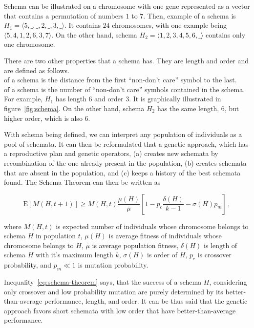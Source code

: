 Schema can be illustrated on a chromosome with one gene represented as a vector that contains a permutation of numbers $1$ to $7$.
Then, example of a schema is $H_1 = \langle 5, \_, \_, 2, \_, 3, \_ \rangle$.
It contains $24$ chromosomes, with one example being $\langle 5, 4, 1, 2, 6, 3, 7 \rangle$.
On the other hand, schema $H_2 = \langle 1, 2, 3, 4, 5, 6, \_ \rangle$ contains only one chromosome.

There are two other properties that a schema has.
They are length and order and are defined as follows.\\

 of a schema is the distance from the first “non-don’t care” symbol to the last.\\

 of a schema is the number of “non-don’t care” symbols contained in the schema.\\

For example, $H_1$ has length $6$ and order $3$.
It is graphically illustrated in figure~\ref{fig:schema}.
On the other hand, schema $H_2$ has the same length, $6$, but higher order, which is also $6$.

With schema being defined, we can interpret any population of individuals as a pool of schemata.
It can then be reformulated that a genetic approach, which has a reproductive plan and
genetic operators, (a) creates new schemata by recombination of the one already present in the population,
(b) creates schemata that are absent in the population, and (c) keeps a history of the best schemata found.
The Schema Theorem can then be written as

\begin{equation}
    \mathrm{E}[M(H, t+1)] \geq M(H, t) \dfrac{\mu(H)}{\overline{\mu}}\left[ 1 - p_c \dfrac{\delta(H)}{k-1} - \sigma(H)
    p_m \right]\,,
    \label{eq:schema-theorem}
\end{equation}

where $M(H, t)$ is expected number of individuals whose chromosome belongs to schema $H$ in population $t$,
$\mu(H)$ is average fitness of individuals whose chromosome belongs to $H$,
$\overline{\mu}$ is average population fitness,
$\delta(H)$ is length of schema $H$ with it’s maximum length $k$,
$\sigma(H)$ is order of $H$,
$p_c$ is crossover probability, and
$p_m \ll 1$ is mutation probability.

Inequality~\ref{eq:schema-theorem} says, that the success of a schema $H$,
considering only crossover and low probability mutation are purely determined
by its better-than-average performance, length, and order.
It can be thus said that the genetic approach favors
short schemata with low order that have better-than-average performance.

